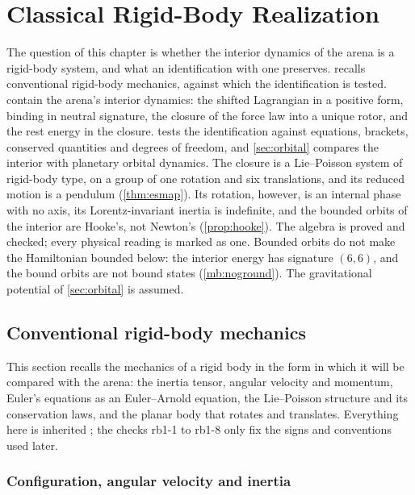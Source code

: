 \chapter{Classical Rigid-Body Realization}
\label{ch:ch04_rigidbody}

The question of this chapter is whether the interior dynamics of the arena is a rigid-body system, and what an identification with
one preserves.  recalls conventional rigid-body mechanics, against which the identification is tested.
 contain the arena's interior dynamics: the shifted Lagrangian in a positive form,
binding in neutral signature, the closure of the force law into a unique rotor, and the rest energy in the closure.  tests
the identification against equations, brackets, conserved quantities and degrees of freedom, and \cref{sec:orbital} compares the interior with
planetary orbital dynamics. The closure is a Lie--Poisson system of rigid-body type, on a group of one rotation and six translations, and its
reduced motion is a pendulum (\cref{thm:esmap}). Its rotation, however, is an internal phase with no axis, its
Lorentz-invariant inertia is indefinite, and the bounded orbits of the interior are Hooke's, not Newton's (\cref{prop:hooke}). The algebra is proved and checked; every physical reading is
marked as one. Bounded orbits do not make the Hamiltonian bounded below: the interior energy has signature $(6,6)$, and the bound orbits are not
bound states (\cref{mb:noground}). The gravitational potential of \cref{sec:orbital} is assumed.

\section{Conventional rigid-body mechanics}
\label{sec:rigidbody}

This section recalls the mechanics of a rigid body in the form in which it will be compared with the arena: the inertia tensor, angular
velocity and momentum, Euler's equations as an Euler--Arnold equation, the Lie--Poisson structure and its conservation laws, and the planar
body that rotates and translates. Everything here is inherited \cite{Euler1765,Arnold66,ArnoldMMCM,LandauLifshitz1,MarsdenRatiu99}; the
checks rb1-1 to rb1-8 only fix the signs and conventions used later.

\subsection{Configuration, angular velocity and inertia}
\label{sec:rb:config}


